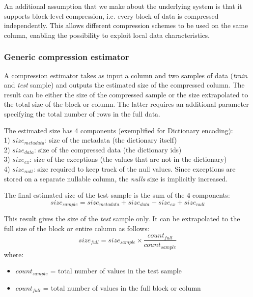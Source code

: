 An additional assumption that we make about the underlying system is that it supports block-level compression, i.e. every block of data is compressed independently. This allows different compression schemes to be used on the same column, enabling the possibility to exploit local data characteristics.

\subsubsection{Generic compression estimator}
\label{subsub:estimator:generic}
A compression estimator takes as input a column and two samples of data (\textit{train} and \textit{test} sample) and outputs the estimated size of the compressed column. The result can be either the size of the compressed sample or the size extrapolated to the total size of the block or column. The latter requires an additional parameter specifying the total number of rows in the full data.

The estimated size has 4 components (exemplified for Dictionary encoding):\\
1) \(size_{metadata}\): size of the metadata (the dictionary itself)\\
2) \(size_{data}\): size of the compressed data (the dictionary ids)\\
3) \(size_{ex}\): size of the exceptions  (the values that are not in the dictionary)\\
4) \(size_{null}\): size required to keep track of the null values. Since exceptions are stored on a separate nullable column, the \textit{nulls} size is implicitly increased.

The final estimated size of the test sample is the sum of the 4 components:
\begin{equation}
\label{eq:estimators:sizesample}
size_{sample} = size_{metadata} + size_{data} + size_{ex} + size_{null}
\end{equation}

This result gives the size of the \textit{test} sample only. It can be extrapolated to the full size of the block or entire column as follows:
\begin{equation}
\label{eq:estimators:sizefinal}
size_{full} = size_{sample} \times \frac{count_{full}}{count_{sample}}
\end{equation}
where:
\begin{itemize}
    \item[] \(count_{sample}\) = total number of values in the test sample
    \item[] \(count_{full}\) = total number of values in the full block or column
\end{itemize}

